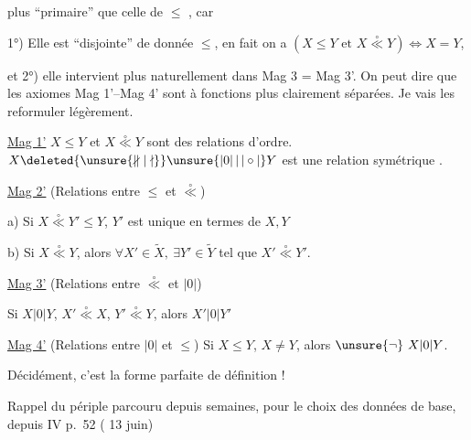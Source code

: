
plus ``primaire'' que celle de $\leq$ , car

1°) Elle est ``disjointe'' de  donnée $\leq$, en fait on a $(X\leq Y\text{ et }X\overset{\circ}{\ll}Y)\Longleftrightarrow X=Y$, 

et 2°) elle intervient plus naturellement dans Mag 3 = Mag 3'. On peut dire   que les axiomes  Mag 1'--Mag 4' sont à fonctions plus clairement séparées. Je vais les reformuler légèrement.

\uline{Mag 1'}  $X\leq Y$ et $X\overset{\circ}{\ll}Y$ sont des relations d'ordre. $X\deleted{\unsure{\nparallel|\nmid}}\unsure{|0|\,|\,|\circ|}Y$ est une relation symétrique .

\uline{Mag 2'} (Relations entre $\leq$ et $\overset{\circ}{\ll}$)

 a) Si $X\overset{\circ}{\ll}Y'\leq Y$, $Y'$ est unique en termes de $X,Y$

 b) Si $X\overset{\circ}{\ll}Y$, alors $\forall X'\in\widetilde X,\ \exists Y'\in\widetilde Y$ tel que $X'\overset{\circ}{\ll}Y'$.

\uline{Mag 3'} (Relations entre $\overset{\circ}{\ll}$ et $|0|$)

Si $X|0|Y$, $X'\overset{\circ}{\ll}X$, $Y'\overset{\circ}{\ll}Y$, alors $X'|0|Y'$

\uline{Mag 4'} (Relations entre $|0|$ et $\leq$) Si $X\leq Y$, $X\neq Y$, alors $\unsure{\neg}\ X|0|Y$.

Décidément, c'est la forme parfaite de définition !

Rappel du périple parcouru depuis  semaines, pour le choix des données de base, depuis  IV p.~52 ( 13 juin)

